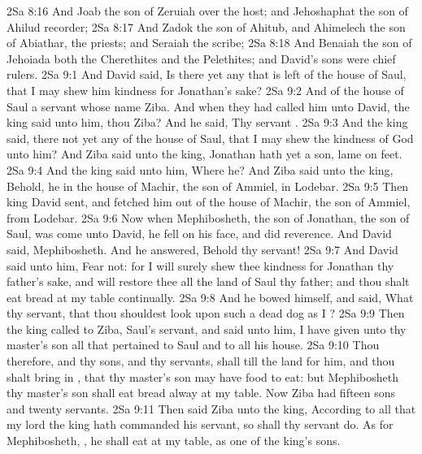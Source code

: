 \vs 2Sa 8:16 And Joab the son of Zeruiah  over the host; and Jehoshaphat the son of Ahilud  recorder;
\vs 2Sa 8:17 And Zadok the son of Ahitub, and Ahimelech the son of Abiathar,  the priests; and Seraiah  the scribe;
\vs 2Sa 8:18 And Benaiah the son of Jehoiada  both the Cherethites and the Pelethites; and David's sons were chief rulers.
\vs 2Sa 9:1 And David said, Is there yet any that is left of the house of Saul, that I may shew him kindness for Jonathan's sake?
\vs 2Sa 9:2 And  of the house of Saul a servant whose name  Ziba. And when they had called him unto David, the king said unto him,  thou Ziba? And he said, Thy servant .
\vs 2Sa 9:3 And the king said,  there not yet any of the house of Saul, that I may shew the kindness of God unto him? And Ziba said unto the king, Jonathan hath yet a son,  lame on  feet.
\vs 2Sa 9:4 And the king said unto him, Where  he? And Ziba said unto the king, Behold, he  in the house of Machir, the son of Ammiel, in Lodebar.
\vs 2Sa 9:5 Then king David sent, and fetched him out of the house of Machir, the son of Ammiel, from Lodebar.
\vs 2Sa 9:6 Now when Mephibosheth, the son of Jonathan, the son of Saul, was come unto David, he fell on his face, and did reverence. And David said, Mephibosheth. And he answered, Behold thy servant!
\vs 2Sa 9:7 And David said unto him, Fear not: for I will surely shew thee kindness for Jonathan thy father's sake, and will restore thee all the land of Saul thy father; and thou shalt eat bread at my table continually.
\vs 2Sa 9:8 And he bowed himself, and said, What  thy servant, that thou shouldest look upon such a dead dog as I ?
\vs 2Sa 9:9 Then the king called to Ziba, Saul's servant, and said unto him, I have given unto thy master's son all that pertained to Saul and to all his house.
\vs 2Sa 9:10 Thou therefore, and thy sons, and thy servants, shall till the land for him, and thou shalt bring in , that thy master's son may have food to eat: but Mephibosheth thy master's son shall eat bread alway at my table. Now Ziba had fifteen sons and twenty servants.
\vs 2Sa 9:11 Then said Ziba unto the king, According to all that my lord the king hath commanded his servant, so shall thy servant do. As for Mephibosheth, , he shall eat at my table, as one of the king's sons.
